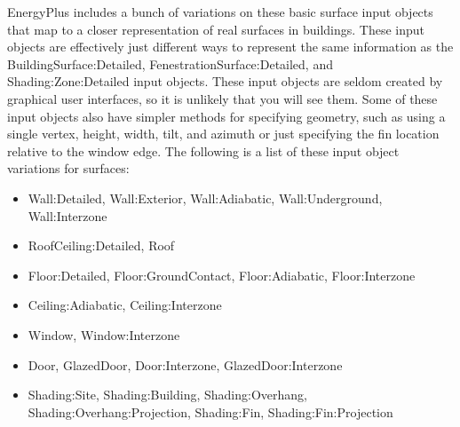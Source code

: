 EnergyPlus includes a bunch of variations on these basic surface input
objects that map to a closer representation of real surfaces in buildings.
These input objects are effectively just different ways to represent
the same information as the BuildingSurface:Detailed, FenestrationSurface:Detailed,
and Shading:Zone:Detailed input objects. These input objects are seldom
created by graphical user interfaces, so it is unlikely that you will
see them. Some of these input objects also have simpler methods for
specifying geometry, such as using a single vertex, height, width,
tilt, and azimuth or just specifying the fin location relative to
the window edge. The following is a list of these input object variations
for surfaces:
\begin{itemize}
\item Wall:Detailed, Wall:Exterior, Wall:Adiabatic, Wall:Underground, Wall:Interzone
\item RoofCeiling:Detailed, Roof
\item Floor:Detailed, Floor:GroundContact, Floor:Adiabatic, Floor:Interzone
\item Ceiling:Adiabatic, Ceiling:Interzone
\item Window, Window:Interzone
\item Door, GlazedDoor, Door:Interzone, GlazedDoor:Interzone
\item Shading:Site, Shading:Building, Shading:Overhang, Shading:Overhang:Projection,
Shading:Fin, Shading:Fin:Projection
\end{itemize}

